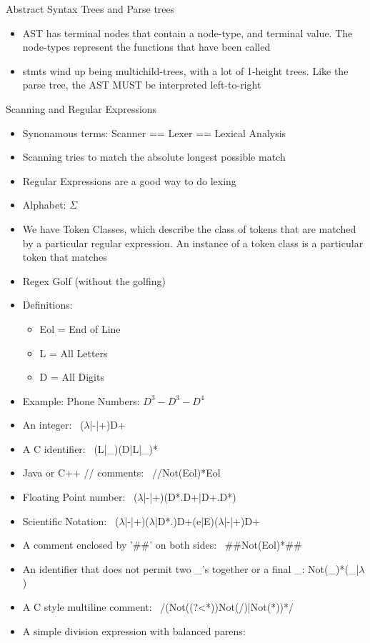 \documentclass[11pt]{article}
\begin{document}
    Abstract Syntax Trees and Parse trees
    \begin{itemize}
        \item AST has terminal nodes that contain a node-type, and terminal value. The node-types represent the functions that have been called
        \item stmts wind up being multichild-trees, with a lot of 1-height trees. Like the parse tree, the AST MUST be interpreted left-to-right
    \end{itemize}

    Scanning and Regular Expressions
    \begin{itemize}
        \item Synonamous terms: Scanner == Lexer == Lexical Analysis
        \item Scanning tries to match the absolute longest possible match
        \item Regular Expressions are a good way to do lexing
        \item Alphabet: $\Sigma$
        \item We have Token Classes, which describe the class of tokens that are matched by a particular regular expression. An instance of a token class is a particular token that matches
        \item Regex Golf (without the golfing)
        \item Definitions:
            \begin{itemize}
                \item Eol = End of Line
                \item L = All Letters
                \item D = All Digits
            \end{itemize}
        \item Example: Phone Numbers: $D^3-D^3-D^4$
        \item An integer: \
            ($\lambda$|-|+)D+
        \item A C identifier: \
            (L|\_)(D|L|\_)*
        \item Java or C++ // comments: \
            //Not(Eol)*Eol
        \item Floating Point number: \
            ($\lambda$|-|+)(D*.D+|D+.D*)
        \item Scientific Notation: \
            ($\lambda$|-|+)($\lambda$|D*.)D+(e|E)($\lambda$|-|+)D+
        \item A comment enclosed by '\#\#' on both sides: \
            \#\#Not(Eol)*\#\#
        \item An identifier that does not permit two \_'s together or a final \_:
            Not(\_)*(\_|$\lambda$)
        \item A C style multiline comment: \
            /\*(Not((?<*))Not(/)|Not(*))*\*/
        \item A simple division expression with balanced parens: \
    \end{itemize}
\end{document}
